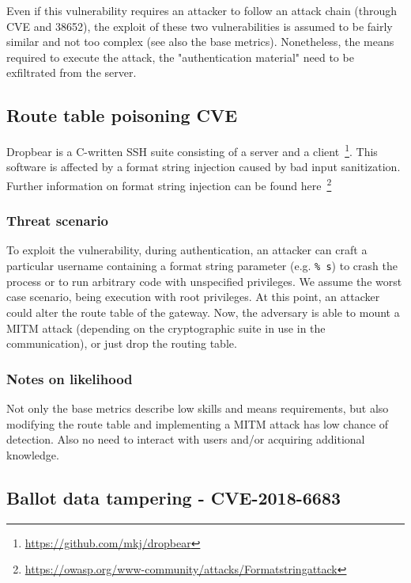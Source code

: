 Even if this vulnerability requires an attacker to follow an attack chain (through CVE and 38652), the exploit of these two vulnerabilities is assumed to be fairly similar and not too complex (see also the base metrics). Nonetheless, the means required to execute the attack, the "authentication material" need to be exfiltrated from the server.

\subsection*{Route table poisoning \- CVE}

Dropbear is a C-written SSH suite consisting of a server and a client~\footnote{\href{https://github.com/mkj/dropbear} {https://github.com/mkj/dropbear}}. This software is affected by a format string injection caused by bad input sanitization. Further information on format string injection can be found here~\footnote{\href{https://owasp.org/www-community/attacks/Format_string_attack} {https://owasp.org/www-community/attacks/Format\textunderscore string\textunderscore attack}}

\subsubsection*{Threat scenario}

To exploit the vulnerability, during authentication, an attacker can craft a particular username containing a format string parameter (e.g. \texttt{\% s}) to crash the process or to run arbitrary code with unspecified privileges. We assume the worst case scenario, being execution with root privileges. At this point, an attacker could alter the route table of the gateway. Now, the adversary is able to mount a MITM attack (depending on the cryptographic suite in use in the communication), or just drop the routing table.

\subsubsection*{Notes on likelihood}

Not only the base metrics describe low skills and means requirements, but also modifying the route table and implementing a MITM attack has low chance of detection. Also no need to interact with users and/or acquiring additional knowledge.

\subsection*{Ballot data tampering - CVE-2018-6683}

